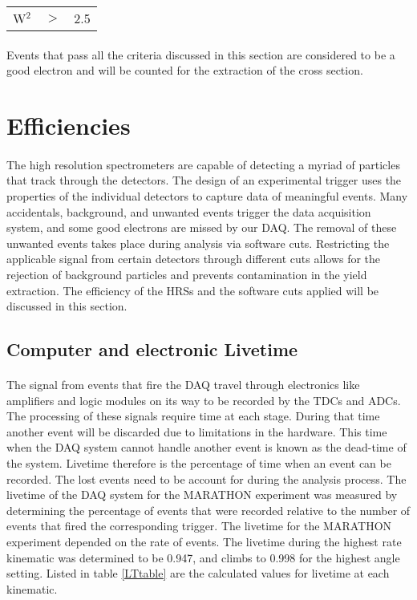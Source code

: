 \begin{tabular}{@{$\bullet$ }lll}
	W$^2$ &$>$ &2.5\\
\end{tabular}

\paragraph{}Events that pass all the criteria discussed in this section are considered to be a good electron and will be counted for the extraction of the cross section. 

\section{Efficiencies}\label{effs}
\paragraph{}The high resolution spectrometers are capable of detecting a myriad of particles that track through the detectors. The design of an experimental trigger uses the properties of the individual detectors to capture data of meaningful events. Many accidentals, background, and unwanted events trigger the data acquisition system, and some good electrons are missed by our DAQ. The removal of these unwanted events takes place during analysis via software cuts. Restricting the applicable signal from certain detectors through different cuts allows for the rejection of background particles and prevents contamination in the yield extraction. The efficiency of the HRSs and the software cuts applied will be discussed in this section.  

\subsection{Computer and electronic Livetime}
\paragraph{}The signal from events that fire the DAQ travel through electronics like amplifiers and logic modules on its way to be recorded by the TDCs and ADCs. The processing of these signals require time at each stage. During that time another event will be discarded due to limitations in the hardware. This time when the DAQ system cannot handle another event is known as the dead-time of the system. Livetime therefore is the percentage of time when an event can be recorded. The lost events need to be account for during the analysis process. The livetime of the DAQ system for the MARATHON experiment was measured by determining the percentage of events that were recorded relative to the number of events that fired the corresponding trigger. The livetime for the MARATHON experiment depended on the rate of events. The livetime during the highest rate kinematic was determined to be 0.947, and climbs to 0.998 for the highest angle setting. Listed in table \ref{LTtable} are the calculated values for livetime at each kinematic. 

